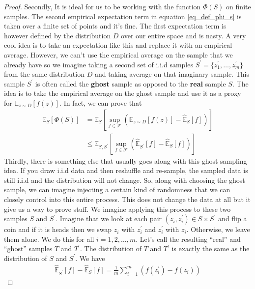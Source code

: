 \documentclass[10pt ]{article}
\begin{document}
\begin{proof}
Secondly, It is ideal for us to be working with the function $\Phi(S)$ on finite samples.  The second empirical expectation term in equation \eqref{eq_def_phi_s} is taken over a finite set of points and it's fine. The first expectation term is however defined by the distribution $D$ over our entire space and is nasty. A very cool idea is to take an expectation like this and replace it with an empirical average. However, we can't use the empirical average on the sample that we already have so we imagine taking a second set of i.i.d samples $S^{\prime} = \{z_1^{\prime}, \dots, z_m^{\prime}\}$ from the same distribution $D$ and taking average on that imaginary sample. This sample $S^{\prime}$ is often called the \textbf{ghost} sample as opposed to the \textbf{real} sample $S$. The idea is to take the empirical average on the ghost sample and use it as a proxy for $\mathbb{E}_{z \sim D} \left[ f(z) \right]$. In fact, we can prove that 
\begin{align}
 \mathbb{E}_S \left[ \Phi(S) \right] &=  \mathbb{E}_S \left[  \sup_{f \in \mathcal{F}}  \left( \mathbb{E}_{z \sim D} \left[ f(z) \right] - \widehat{\mathbb{E}}_{S}\left[ f\right] \right) \right] \nonumber \\
 &\le  \mathbb{E}_{S, S^{\prime}} \left[  \sup_{f \in \mathcal{F}}  \left(  \widehat{\mathbb{E}}_{S^{\prime}}\left[ f\right]  - \widehat{\mathbb{E}}_{S}\left[ f\right] \right) \right]
 \label{eq_second_idea_rademacher_proof}
\end{align}
Thirdly, there is something else that usually goes along with this ghost sampling idea. If you draw i.i.d data and then reshuffle and re-sample, the sampled data is still i.i.d and the distribution will not change. So, along with choosing the ghost sample, we can imagine injecting a certain kind of randomness that we can closely control into this entire process.  This does not change the data at all but it give us a way to prove stuff. We imagine applying this process to these two samples $S$ and $S^{\prime}$. Imagine that we look at each pair $(z_i, z_i^{\prime}) \in S \times S^{\prime}$ and flip a coin and if it is heads then we swap $z_i$ with $z_i^{\prime}$ and $z_i^{\prime}$ with $z_i$. Otherwise, we leave them alone. We do this for all $i=1,2,\dots,m$. Let's call the resulting ``real'' and ``ghost'' samples $T$ and $T^{\prime}$. The distribution of $T$ and $T^{\prime}$ is exactly the same as the distribution of $S$ and $S^{\prime}$. We have 
\begin{align}
 \widehat{\mathbb{E}}_{S^{\prime}}\left[ f\right]  - \widehat{\mathbb{E}}_{S}\left[ f\right]  = \frac{1}{m} \sum_{i=1}^m \left( f(z_i^{\prime}) - f(z_i)  \right)

\end{align}
\end{proof}
\end{document}
